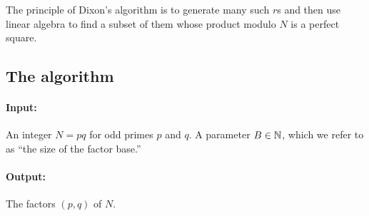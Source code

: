 The principle of Dixon's algorithm is to generate many such $r$s
and then use linear algebra to find a subset of them whose product
modulo $N$ is a perfect square. 

\subsection{The algorithm}

\paragraph{Input:} An integer $N = pq$ for odd primes $p$ and $q$. A parameter $B \in \mathbb{N}$,
which we refer to as ``the size of the factor base.''

\paragraph{Output:} The factors $(p,q)$ of $N$.


